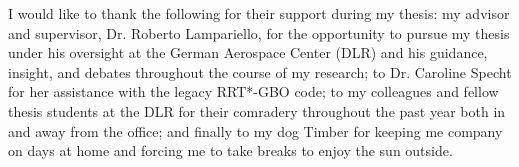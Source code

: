I would like to thank the following for their support during my thesis:
my advisor and supervisor, Dr. Roberto Lampariello, for the opportunity to pursue my thesis under his oversight at the German Aerospace Center (DLR) and his guidance, insight, and debates throughout the course of my research;
to Dr. Caroline Specht for her assistance with the legacy RRT*-GBO code;
to my colleagues and fellow thesis students at the DLR for their comradery throughout the past year both in and away from the office;
and finally to my dog Timber for keeping me company on days at home and forcing me to take breaks to enjoy the sun outside.
